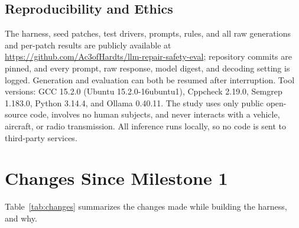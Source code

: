 \documentclass[12pt]{IEEEtran}
\begin{document}
\subsection{Reproducibility and Ethics}
The harness, seed patches, test drivers, prompts, rules, and all raw generations and per-patch results are publicly available at \url{https://github.com/Ac3ofHardts/llm-repair-safety-eval}; repository commits are pinned, and every prompt, raw response, model digest, and decoding setting is logged. Generation and evaluation can both be resumed after interruption. Tool versions: GCC 15.2.0 (Ubuntu 15.2.0-16ubuntu1), Cppcheck 2.19.0, Semgrep 1.183.0, Python 3.14.4, and Ollama 0.40.11. The study uses only public open-source code, involves no human subjects, and never interacts with a vehicle, aircraft, or radio transmission. All inference runs locally, so no code is sent to third-party services.

\section{Changes Since Milestone 1}
Table~\ref{tab:changes} summarizes the changes made while building the harness, and why.

\begin{table}[t]
    \centering
    \caption{Changes since Milestone 1}
    \label{tab:changes}
    \footnotesize
\end{table}
\end{document}
